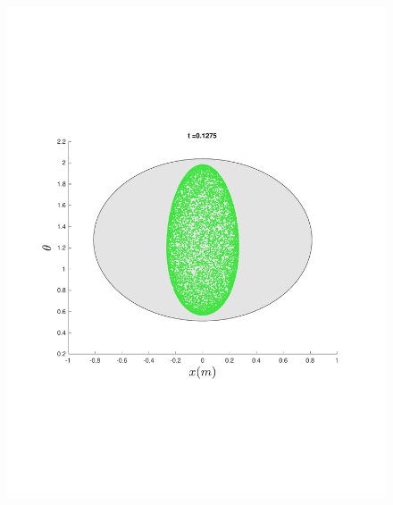 \begin{figure}
{\begin{minipage}{0.5\textwidth}
\begin{minipage}[b]{0.5\textwidth}
        \includegraphics[width=\textwidth]{figures/method/FunnelSimOverlaid18funnel-1y-theta}
      \end{minipage}%
      \begin{minipage}[b]{0.5\textwidth}

\end{minipage}
\end{minipage}}
\end{figure}
